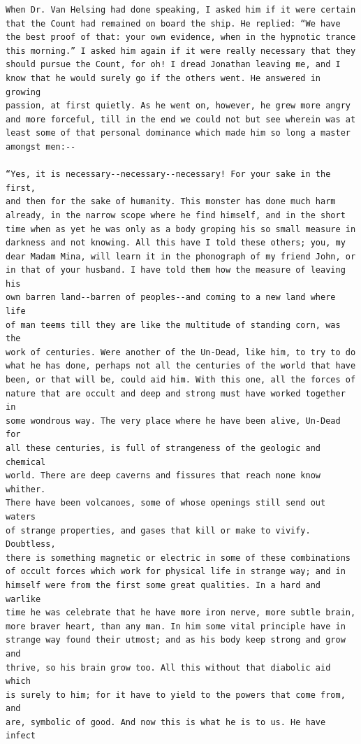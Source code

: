 \documentclass{article}
\begin{document}
\begin{verbatim}
When Dr. Van Helsing had done speaking, I asked him if it were certain
that the Count had remained on board the ship. He replied: “We have
the best proof of that: your own evidence, when in the hypnotic trance
this morning.” I asked him again if it were really necessary that they
should pursue the Count, for oh! I dread Jonathan leaving me, and I
know that he would surely go if the others went. He answered in growing
passion, at first quietly. As he went on, however, he grew more angry
and more forceful, till in the end we could not but see wherein was at
least some of that personal dominance which made him so long a master
amongst men:--

“Yes, it is necessary--necessary--necessary! For your sake in the first,
and then for the sake of humanity. This monster has done much harm
already, in the narrow scope where he find himself, and in the short
time when as yet he was only as a body groping his so small measure in
darkness and not knowing. All this have I told these others; you, my
dear Madam Mina, will learn it in the phonograph of my friend John, or
in that of your husband. I have told them how the measure of leaving his
own barren land--barren of peoples--and coming to a new land where life
of man teems till they are like the multitude of standing corn, was the
work of centuries. Were another of the Un-Dead, like him, to try to do
what he has done, perhaps not all the centuries of the world that have
been, or that will be, could aid him. With this one, all the forces of
nature that are occult and deep and strong must have worked together in
some wondrous way. The very place where he have been alive, Un-Dead for
all these centuries, is full of strangeness of the geologic and chemical
world. There are deep caverns and fissures that reach none know whither.
There have been volcanoes, some of whose openings still send out waters
of strange properties, and gases that kill or make to vivify. Doubtless,
there is something magnetic or electric in some of these combinations
of occult forces which work for physical life in strange way; and in
himself were from the first some great qualities. In a hard and warlike
time he was celebrate that he have more iron nerve, more subtle brain,
more braver heart, than any man. In him some vital principle have in
strange way found their utmost; and as his body keep strong and grow and
thrive, so his brain grow too. All this without that diabolic aid which
is surely to him; for it have to yield to the powers that come from, and
are, symbolic of good. And now this is what he is to us. He have infect

\end{verbatim}
\end{document}

